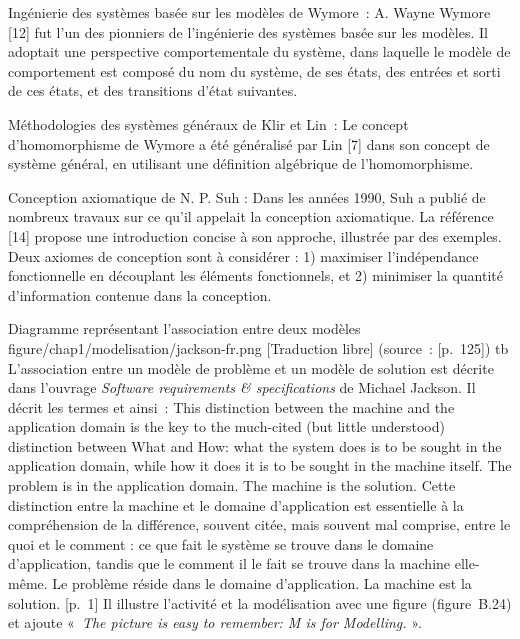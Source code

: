 {{\item [][---] Ingénierie des systèmes basée sur les modèles de Wymore~: A. Wayne Wymore [12] fut l’un des pionniers de l’ingénierie des systèmes basée sur les modèles. Il adoptait une perspective comportementale du système, dans laquelle le modèle de comportement est composé du nom du système, de ses états, des entrées et sorti de ces états, et des transitions d’état suivantes.
\item [][---] Méthodologies des systèmes généraux de Klir et Lin~: Le concept d’homomorphisme de Wymore a été généralisé par Lin [7] dans son concept de système général, en utilisant une définition algébrique de l’homomorphisme.
\item [][---] Conception axiomatique de N. P. Suh : Dans les années 1990, Suh a publié de nombreux travaux sur ce qu’il appelait la conception axiomatique. La référence [14] propose une introduction concise à son approche, illustrée par des exemples. Deux axiomes de conception sont à considérer : 1) maximiser l’indépendance fonctionnelle en découplant les éléments fonctionnels, et 2) minimiser la quantité d’information contenue dans la conception.
}{\cite{dickerson_brief_2013}}
\figmedium
{Diagramme représentant l'association entre deux modèles}
{figure/chap1/modelisation/jackson-fr.png}
{[Traduction libre] (source~: [p.~125])}
{}{}{tb}
L'association entre un modèle de problème et un modèle de solution est décrite dans l'ouvrage \textit{Software requirements \& specifications} de Michael Jackson. Il décrit les termes  et  ainsi~:
\quoteenfr
{This distinction between the machine and the application domain is the key to the much-cited (but little understood) distinction between What and How: what the system does is to be sought in the application domain, while how it does it is to be sought in the machine itself. The problem is in the application domain. The machine is the solution.}
{Cette distinction entre la machine et le domaine d'application est essentielle à la compréhension de la différence, souvent citée, mais souvent mal comprise, entre le quoi et le comment : ce que fait le système se trouve dans le domaine d'application, tandis que le comment il le fait se trouve dans la machine elle-même. Le problème réside dans le domaine d'application. La machine est la solution.}
{[p.~1]}
Il illustre l'activité et la modélisation avec une figure (figure~B.24) et ajoute «~\textit{The picture is easy to remember: M is for Modelling.} ».
}{}

